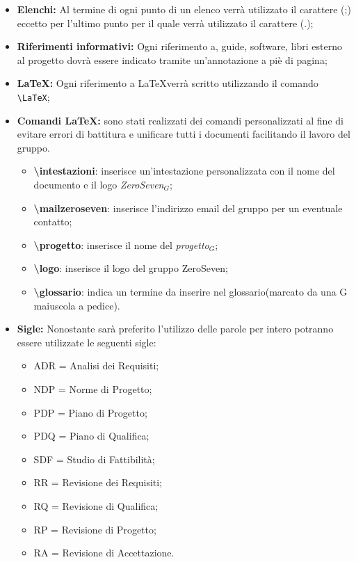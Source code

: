 \begin{itemize}
	\item \textbf{Elenchi:} Al termine di ogni punto di un elenco verrà utilizzato il carattere (;) eccetto per l'ultimo punto per il quale verrà utilizzato il carattere (.);
	\item \textbf{Riferimenti informativi:} Ogni riferimento a, guide, software,
	libri esterno al progetto dovrà essere indicato tramite un’annotazione a piè di pagina;
	\item \textbf{\LaTeX:} Ogni riferimento a \LaTeX verrà scritto utilizzando il comando \texttt{\textbackslash LaTeX};
	\item \textbf{Comandi \LaTeX:} sono stati realizzati dei comandi personalizzati al fine di evitare errori di battitura e unificare tutti i documenti facilitando il lavoro del gruppo.
	\begin{itemize}
		\item \textbf{ \textbackslash intestazioni}: inserisce un'intestazione personalizzata con il nome del documento e il logo \textit{ZeroSeven$_{G}$};
		\item \textbf{ \textbackslash mailzeroseven}: inserisce l'indirizzo email del gruppo per un eventuale contatto;
		\item \textbf{ \textbackslash progetto}: inserisce il nome del \textit{progetto$_{G}$};
		\item \textbf{ \textbackslash logo}: inserisce il logo del gruppo ZeroSeven;
		\item \textbf{ \textbackslash glossario}: indica un termine da inserire nel glossario(marcato da una G maiuscola a pedice).	
	\end{itemize}
	
	\item \textbf{Sigle:} Nonostante sarà preferito l'utilizzo delle parole per intero potranno essere utilizzate le seguenti sigle:
	\begin{itemize}
	\item ADR = Analisi dei Requisiti;
	\item NDP = Norme di Progetto;
	\item PDP = Piano di Progetto;
	\item PDQ = Piano di Qualifica;
	\item SDF = Studio di Fattibilità;
	\item RR = Revisione dei Requisiti;
	\item RQ = Revisione di Qualifica;
	\item RP = Revisione di Progetto;
	\item RA = Revisione di Accettazione.
	\end{itemize}
\end{itemize}
